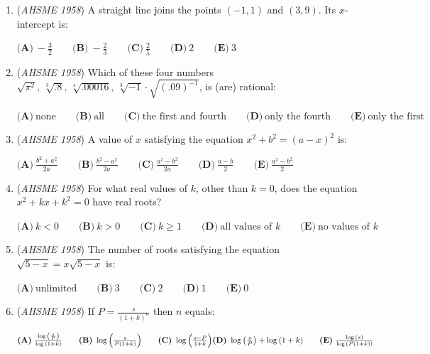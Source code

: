 \begin{enumerate}
	\item (\textit{AHSME 1958}) A straight line joins the points $(-1,1)$ and $(3,9)$. Its $x$-intercept is:


 $\textbf{(A)}\ -\frac{3}{2}\qquad  \textbf{(B)}\ -\frac{2}{3}\qquad  \textbf{(C)}\ \frac{2}{5}\qquad  \textbf{(D)}\ 2\qquad  \textbf{(E)}\ 3$


	\item (\textit{AHSME 1958}) Which of these four numbers $\sqrt{\pi^2},\,\sqrt[3]{.8},\,\sqrt[4]{.00016},\,\sqrt[3]{-1}\cdot \sqrt{(.09)^{-1}}$, is (are) rational:


 $\textbf{(A)}\ \text{none}\qquad  \textbf{(B)}\ \text{all}\qquad  \textbf{(C)}\ \text{the first and fourth}\qquad  \textbf{(D)}\ \text{only the fourth}\qquad  \textbf{(E)}\ \text{only the first}$


	\item (\textit{AHSME 1958}) A value of $x$ satisfying the equation $x^2 + b^2 = (a - x)^2$ is:


 $\textbf{(A)}\ \frac{b^2 + a^2}{2a}\qquad  \textbf{(B)}\ \frac{b^2 - a^2}{2a}\qquad  \textbf{(C)}\ \frac{a^2 - b^2}{2a}\qquad  \textbf{(D)}\ \frac{a - b}{2}\qquad  \textbf{(E)}\ \frac{a^2 - b^2}{2}$


	\item (\textit{AHSME 1958}) For what real values of $k$, other than $k = 0$, does the equation $x^2 + kx + k^2 = 0$ have real roots?


 $\textbf{(A)}\ {k < 0}\qquad  \textbf{(B)}\ {k > 0} \qquad  \textbf{(C)}\ {k \ge 1} \qquad  \textbf{(D)}\ \text{all values of }{k}\qquad  \textbf{(E)}\ \text{no values of }{k}$


	\item (\textit{AHSME 1958}) The number of roots satisfying the equation $\sqrt{5 - x} = x\sqrt{5 - x}$ is:


 $\textbf{(A)}\ \text{unlimited}\qquad  \textbf{(B)}\ 3\qquad  \textbf{(C)}\ 2\qquad  \textbf{(D)}\ 1\qquad  \textbf{(E)}\ 0$


	\item (\textit{AHSME 1958}) If $P = \frac{s}{(1 + k)^n}$ then $n$ equals:


 $\textbf{(A)}\ \frac{\log{\left(\frac{s}{P}\right)}}{\log{(1 + k)}}\qquad  \textbf{(B)}\ \log{\left(\frac{s}{P(1 + k)}\right)}\qquad  \textbf{(C)}\ \log{\left(\frac{s - P}{1 + k}\right)}\qquad \\ \textbf{(D)}\ \log{\left(\frac{s}{P}\right)} + \log{(1 + k)}\qquad  \textbf{(E)}\ \frac{\log{(s)}}{\log{(P(1 + k))}}$



\end{enumerate}
